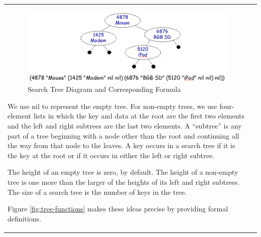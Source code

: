 \begin{tabular}{ll}
\begin{figure}
\begin{center}
\includegraphics[scale=0.5]{images/searchtree.png}
\end{center}
\caption{Search Tree Diagram and Corresponding Formula}
\label{fig:searchtree-diagram}
\end{figure}

\label{empty-tree}
We use nil to represent the empty tree.
For non-empty trees, we use
four-element lists in which the key and data at
the root are the first two elements and the left
and right subtrees are the last two elements.
\label{subtree}
A ``subtree'' is any part of a tree beginning with a node
other than the root
and continuing all the way from that node to the leaves.
A key occurs in a search tree if it is the key at the root
or if it occurs in either the left or right subtree.

\label{subtree}
The height of an empty tree is zero, by default.
The height of a non-empty tree is one more than the 
larger of the heights of its left and right subtrees.
The size of a search tree is the number of keys in the tree.

Figure \ref{fig:tree-functions} makes these ideas precise
by providing formal definitions.


\end{tabular}
